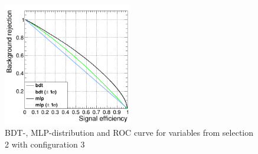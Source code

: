 \documentclass[11pt]{scrartcl}
\begin{document}
\begin{figure}[H]
\begin{minipage}{.5\textwidth}
	  \label{fig:distr_s2_config3_mlp}
	\end{minipage}
	\centering
	\includegraphics[width=0.5\textwidth]{figures/MVA/select2/config3/FOM_selection2_nL10_nT1000_mD5_nC50.png}
	\caption{BDT-, MLP-distribution and ROC curve for variables from selection 2 with configuration 3}
	 \label{fig:ROC_s2_config3}	
	\end{figure}
	
\end{document}
